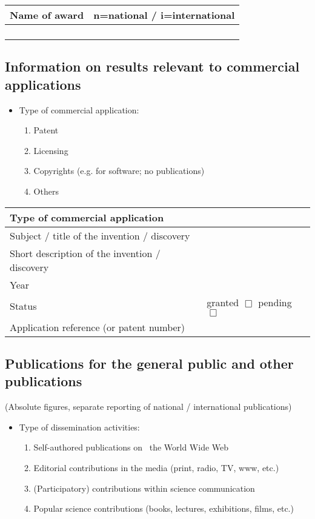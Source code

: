 \documentclass[a4paper, 11pt]{article}
\begin{document}
\begin{tabular}{|p{9cm}|c|}
\multicolumn{1}{c}{\textbf{Name of award}} & \multicolumn{1}{c}{\textbf{n=national / i=international}} \\
\hline
 & \\
\hline
 & \\
\hline
 & \\
\hline
 & \\
\hline
\end{tabular}


\subsection{Information on results relevant to commercial applications}

\begin{itemize}
\item Type of commercial application:
  \begin{enumerate}
    \item Patent
    \item Licensing
    \item Copyrights (e.g. for software; no publications)
    \item Others
  \end{enumerate}
\end{itemize}

\begin{tabular}{|l|l|}
\hline
Type of commercial application & \\
\hline
Subject / title of the invention / discovery & \\
\hline
Short description of the invention / discovery & \\
\hline
Year & \\
\hline
Status & granted $\Box$ \hspace{2cm} pending $\Box$ \\
\hline
Application reference (or patent number) & \\
\hline
\end{tabular}

\subsection{Publications for the general public and other publications}

(Absolute figures, separate reporting of national / international publications)

\begin{itemize}
  \item Type of dissemination activities:
  \begin{enumerate}
    \item Self-authored publications on  the World Wide Web
    \item Editorial contributions in the media (print, radio, TV, www, etc.)
    \item (Participatory) contributions within science communication
    \item Popular science contributions (books, lectures, exhibitions, films, etc.)
  \end{enumerate}
\end{itemize}
\end{document}
